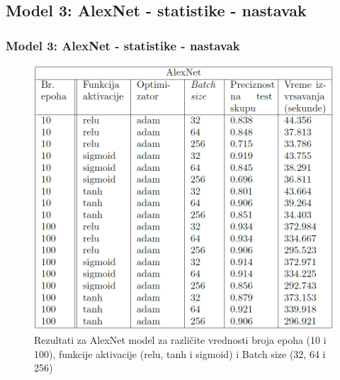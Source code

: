 \documentclass{beamer}
\begin{document}
\subsection{Model 3: AlexNet - statistike - nastavak}
\begin{frame}
\frametitle{Model 3: AlexNet - statistike - nastavak}

\begin{figure}
\includegraphics[scale=0.42]{alexNet_tabela.png}
\caption{Rezultati za AlexNet model za različite vrednosti broja epoha (10 i 100), funkcije aktivacije (relu, tanh i sigmoid) i Batch size (32, 64 i 256)}
\end{figure}

\end{frame}
\end{document}
